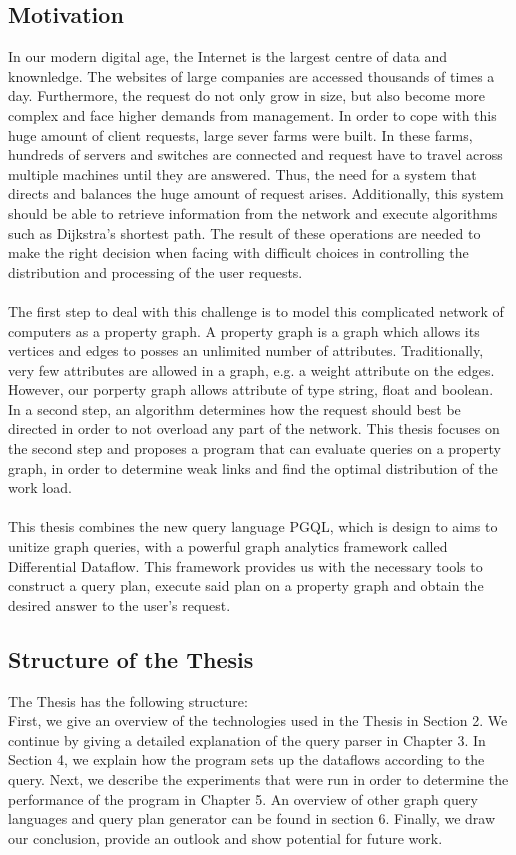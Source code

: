 \documentclass[11pt,singlecolumn]{scrartcl}
\begin{document}
\subsection{Motivation}
In our modern digital age, the Internet is the largest centre of data and knownledge. The websites of large companies are accessed thousands of times a day. Furthermore, the request do not only grow in size, but also become more complex and face higher demands from management. In order to cope with this huge amount of client requests, large sever farms were built. In these farms, hundreds of servers and switches are connected and request have to travel across multiple machines until they are answered. Thus, the need for a system that directs and balances the huge amount of request arises. Additionally, this system should be able to retrieve information from the network and execute algorithms such as Dijkstra's shortest path. The result of these operations are needed to make the right decision when facing with difficult choices in controlling the distribution and processing of the user requests.\\\\
The first step to deal with this challenge is to model this complicated network of computers as a property graph. A property graph is a graph which allows its vertices and edges to posses an unlimited number of attributes. Traditionally, very few attributes are allowed in a graph, e.g. a weight attribute on the edges. However, our porperty graph allows attribute of type string, float and boolean.\\ In a second step, an algorithm determines how the request should best be directed in order to not overload any part of the network. This thesis focuses on the second step and proposes a program that can evaluate queries on a property graph, in order to determine weak links and find the optimal distribution of the work load.\\\\
This thesis combines the new query language PGQL, which is design to aims to unitize graph queries, with a powerful graph analytics framework called Differential Dataflow. This framework provides us with the necessary tools to construct a query plan, execute said plan on a property graph and obtain the desired answer to the user's request.
\subsection{Structure of the Thesis}
The Thesis has the following structure:\\
First, we give an overview of the technologies used in the Thesis in Section 2.
We continue by giving a detailed explanation of the query parser  in Chapter 3. In Section 4, we explain how the program sets up the dataflows according to the query. Next, we describe the experiments that were run in order to determine the performance of the program in Chapter 5. An overview of other graph query languages and query plan generator can be found in section 6. Finally, we draw our conclusion, provide an outlook and show potential for future work.
\clearpage
\end{document}
